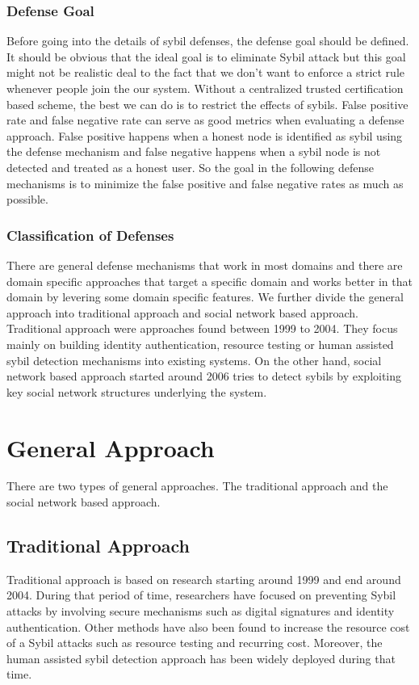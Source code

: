 \documentclass[conference]{IEEEtran}
\begin{document}
\subsubsection{Defense Goal}
Before going into the details of sybil defenses, the defense goal should be defined. It should be obvious that the ideal goal is to eliminate Sybil attack
but this goal might not be realistic deal to the fact that we don't want to enforce a strict rule whenever people join the our system.
Without a centralized trusted certification based scheme, the best we can do is to restrict the effects of sybils. False positive rate and false negative rate 
can serve as good metrics when evaluating a defense approach. False positive happens when a honest node is identified as sybil using the defense mechanism and
false negative happens when a sybil node is not detected and treated as a honest user. So the goal in the following defense mechanisms is to minimize the false 
positive and false negative rates as much as possible.

\subsubsection{Classification of Defenses}
There are general defense mechanisms that work in most domains and there are domain specific approaches that target a specific domain and works better in that domain by levering some 
domain specific features. We further divide the general approach into traditional approach and social network based approach. 
Traditional approach were approaches found between 1999 to 2004. They focus mainly on building identity authentication, resource testing or human assisted sybil detection mechanisms
 into existing systems. On the other hand, social network based approach started around 2006 tries to detect sybils by exploiting key social network structures underlying the system.

\section{General Approach}
There are two types of general approaches. The traditional approach and the social network based approach. 

\subsection{Traditional Approach}
Traditional approach is based on research starting around 1999 and end around 2004. During that period of time, researchers have focused on preventing Sybil attacks by involving secure mechanisms such as digital signatures and identity authentication. Other methods have also been found to increase the resource cost of a Sybil attacks such as resource testing and recurring cost. Moreover, the human assisted sybil detection approach has been widely deployed during that time.
\end{document}
